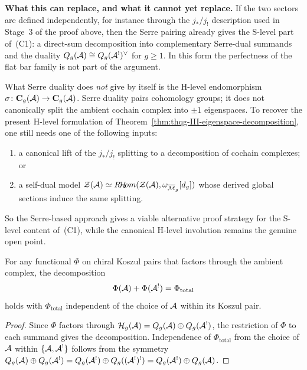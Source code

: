 \begin{remark}
\smallskip\noindent
\textbf{What this can replace, and what it cannot yet replace.}\;
If the two sectors are defined independently, for instance through the
$j_*/j_!$ description used in Stage~3 of the proof above, then the
Serre pairing already gives the S-level part of~(C1): a direct-sum
decomposition into complementary Serre-dual summands and the duality
$Q_g(\mathcal{A})\cong Q_g(\mathcal{A}^!)^{\vee}$ for $g\geq 1$. In this form the
perfectness of the flat bar family is not part of the argument.

\smallskip\noindent
What Serre duality does \emph{not} give by itself is the H-level
endomorphism
$\sigma\colon \mathbf{C}_g(\mathcal{A})\to \mathbf{C}_g(\mathcal{A})$.
Serre duality pairs cohomology groups; it does not canonically split
the ambient cochain complex into $\pm 1$ eigenspaces. To recover the
present H-level formulation of Theorem~\ref{thm:thqg-III-eigenspace-decomposition},
one still needs one of the following inputs:
\begin{enumerate}[label=\textup{(\roman*)}]
\item a canonical lift of the $j_*/j_!$ splitting to a decomposition of
 cochain complexes; or
\item a self-dual model
 $\mathcal{Z}(\mathcal{A})\simeq
 R\!\mathcal{H}\!om(\mathcal{Z}(\mathcal{A}),
 \omega_{\overline{\mathcal{M}}_g}[d_g])$
 whose derived global sections induce the same splitting.
\end{enumerate}
So the Serre-based approach gives a viable alternative proof strategy
for the S-level content of~(C1), while the canonical H-level
involution remains the genuine open point.
\end{remark}

\begin{corollary}
\label{cor:thqg-III-complementarity-exchange}
For any functional $\Phi$ on chiral Koszul pairs that
factors through the ambient complex, the decomposition
\[
\Phi(\mathcal{A}) + \Phi(\mathcal{A}^!) = \Phi_{\mathrm{total}}
\]
holds with $\Phi_{\mathrm{total}}$ independent of the choice
of $\mathcal{A}$ within its Koszul pair.
\end{corollary}

\begin{proof}
Since $\Phi$ factors through
$\mathcal{H}_g(\mathcal{A}) = Q_g(\mathcal{A}) \oplus Q_g(\mathcal{A}^!)$,
the restriction of $\Phi$ to each summand gives the
decomposition. Independence of $\Phi_{\mathrm{total}}$
from the choice of $\mathcal{A}$ within $\{\mathcal{A}, \mathcal{A}^!\}$
follows from the symmetry $Q_g(\mathcal{A}) \oplus Q_g(\mathcal{A}^!)
= Q_g(\mathcal{A}^!) \oplus Q_g((\mathcal{A}^!)^!) = Q_g(\mathcal{A}^!) \oplus Q_g(\mathcal{A})$.
\end{proof}

